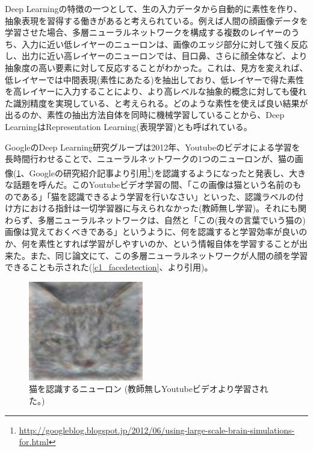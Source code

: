 Deep Learningの特徴の一つとして、生の入力データから自動的に素性を作り、抽象表現を習得する働きがあると考えられている。例えば人間の顔画像データを学習させた場合、多層ニューラルネットワークを構成する複数のレイヤーのうち、入力に近い低レイヤーのニューロンは、画像のエッジ部分に対して強く反応し、出力に近い高レイヤーのニューロンでは、目口鼻、さらに顔全体など、より抽象度の高い要素に対して反応することがわかった。これは、見方を変えれば、低レイヤーでは中間表現(素性にあたる)を抽出しており、低レイヤーで得た素性を高レイヤーに入力することにより、より高レベルな抽象的概念に対しても優れた識別精度を実現している、と考えられる。どのような素性を使えば良い結果が出るのか、素性の抽出方法自体を同時に機械学習していることから、Deep LearningはRepresentation Learning(表現学習)とも呼ばれている。\par
GoogleのDeep Learning研究グループは2012年、Youtubeのビデオによる学習を長時間行わせることで、ニューラルネットワークの1つのニューロンが、猫の画像(\ref{c1_catdetection}、Googleの研究紹介記事より引用\footnote{\url{http://googleblog.blogspot.jp/2012/06/using-large-scale-brain-simulations-for.html}})を認識するようになったと発表し、大きな話題を呼んだ\cite{le2012building}。このYoutubeビデオ学習の間、「この画像は猫という名前のものである」「猫を認識できるよう学習を行いなさい」といった、認識ラベルの付け方における指針は一切学習器に与えられなかった(教師無し学習)。それにも関わらず、多層ニューラルネットワークは、自然と「この(我々の言葉でいう猫の)画像は覚えておくべきである」というように、何を認識すると学習効率が良いのか、何を素性とすれば学習がしやすいのか、という情報自体を学習することが出来た。また、同じ論文にて、この多層ニューラルネットワークが人間の顔を学習できることも示された(\ref{c1_facedetection}、\cite{le2012building}より引用)。\par
\begin{figure}[tbp]
 \begin{center}
  \includegraphics[width=50mm]{img/c1/cat_detection}
 \end{center}
 \caption{猫を認識するニューロン (教師無しYoutubeビデオより学習された。)}
 \label{c1_catdetection}
\end{figure}
